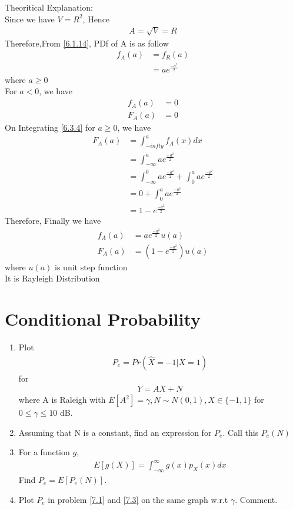 \documentclass[journal,12pt,twocolumn]{IEEEtran}
\renewcommand\thesection{\arabic{section}}
\begin{document}
\begin{enumerate}[label=\thesection.\arabic*.,ref=\thesection.\theenumi]
Theoritical Explanation:\\
Since we have $V=R^2$, Hence
\begin{align}
    A = \sqrt{V} = R
\end{align}
Therefore,From \eqref{6.1.14}, PDf of A is as follow
\begin{align}
    f_A(a) &= f_R(a) \\
    &= ae^{\frac{-a^2}{2}} \label{6.3.4}
\end{align}
where $a \geq 0$\\
For $a<0$, we have
\begin{align}
    f_A(a) &= 0\\
    F_A(a) &= 0
\end{align}
On Integrating \eqref{6.3.4} for $a \geq 0$, we have 
\begin{align}
    F_A(a)&=\int_{-infty}^{a} f_A(x)dx \\
    &=\int_{-\infty}^{a} ae^{\frac{-a^2}{2}}\\
    &=\int_{-\infty}^{0} ae^{\frac{-a^2}{2}}+\int_{0}^{a} ae^{\frac{-a^2}{2}}\\
    &=0+\int_{0}^a ae^{\frac{-a^2}{2}}\\
    &=1-e^{\frac{-a^2}{2}}
\end{align}
Therefore, Finally we have
\begin{align}
    f_A(a) &= ae^{\frac{-a^2}{2}}u(a) \\
    F_A(a) &= (1-e^{\frac{-a^2}{2}})u(a)
\end{align}
where $u(a)$ is unit step function\\
It is Rayleigh Distribution
\end{enumerate}
\section{Conditional Probability}
\begin{enumerate}[label=\thesection.\arabic*.,ref=\thesection.\theenumi]
\item Plot \begin{align}
    P_e = Pr(\hat{X} = -1 | X=1) \label{7.1}
\end{align}
for \begin{align}
    Y=AX+N
\end{align}
where A is Raleigh with $E[A^2]=\gamma,N \sim N(0,1), X \in \{-1,1\}$ for $0 \leq \gamma \leq 10$ dB. 
\item Assuming that N is a constant, find an expression for $P_e$. Call this $P_e(N)$
\item For a function $g$,
\begin{align}
    E[g(X)] = \int_{-\infty}^{\infty} g(x)p_X(x) dx \label{7.3}
\end{align}
Find $P_e = E[P_e(N)]$.
\item Plot $P_e$ in problem \eqref{7.1} and \eqref{7.3} on the same graph w.r.t $\gamma$. Comment.
\end{enumerate}
\end{document}

